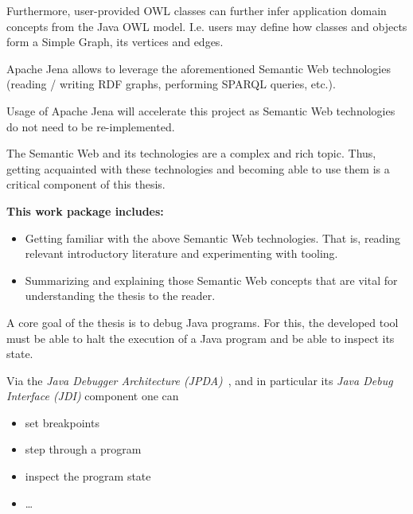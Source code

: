 \documentclass[
	english,
	accentcolor=9c,%
  marginpar=0cm %
	]{tudapub}
\begin{document}
\begin{description}
\begin{description}[font=\normalfont]
        Furthermore, user-provided OWL classes can further infer application
        domain concepts from the Java OWL model. %
        I.e. users may define how classes and objects form a Simple Graph,
        its vertices and edges.
      \item[The \emph{Apache Jena Java Framework for Semantic Web Applications}]
        Apache Jena allows to leverage the aforementioned Semantic Web
        technologies (reading / writing RDF graphs, performing SPARQL queries,
        etc.).

        Usage of Apache Jena will accelerate this project as Semantic Web
        technologies do not need to be re-implemented.
      \item[(...potentially more relevant technologies...)]
    \end{description}

    The Semantic Web and its technologies are a complex and rich topic.
    Thus, getting acquainted with these technologies and becoming able to use
    them is a critical component of this thesis.

    \textbf{This work package includes:}
    \begin{itemize}
      \item Getting familiar with the above Semantic Web technologies.
        That is, reading relevant introductory literature and experimenting with
        tooling.
      \item Summarizing and explaining those Semantic Web concepts that are
        vital for understanding the thesis to the reader.
    \end{itemize}
  \item[B: Pausing Java program execution \& Accessing JVM State]
    A core goal of the thesis is to debug Java programs. For this, the developed
    tool must be able to halt the execution of a Java program and be able to
    inspect its state.

    Via the \emph{Java Debugger Architecture (JPDA)}~\cite{jpda}, and in
    particular its \emph{Java Debug Interface (JDI)} component one can
    \begin{itemize}
      \item set breakpoints
      \item step through a program
      \item inspect the program state
      \item \ldots
    \end{itemize}


\end{description}
\end{document}
